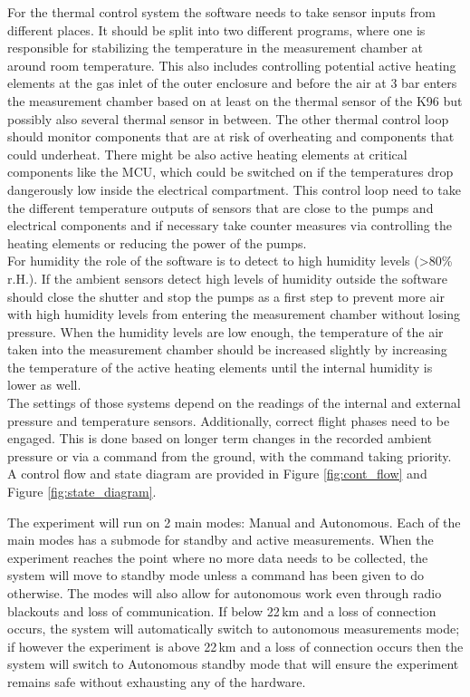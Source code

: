 \documentclass[
  a4paper,
  11pt,
  openany,
  parskip,
  toc=totoc,
  listof=totoc,
  bibliography=totoc
]{scrreprt}
\begin{document}
For the thermal control system the software needs to take sensor inputs from different places. It should be split into two different programs, where one is responsible for stabilizing the temperature in the measurement chamber at around room temperature. This also includes controlling potential active heating elements at the gas inlet of the outer enclosure and before the air at 3 bar enters the measurement chamber based on at least on the thermal sensor of the K96 but possibly also several thermal sensor in between. The other thermal control loop should monitor components that are at risk of overheating and components that could underheat. There might be also active heating elements at critical components like the MCU, which could be switched on if the temperatures drop dangerously low inside the electrical compartment. This control loop need to take the different temperature outputs of sensors that are close to the pumps and electrical components and if necessary take counter measures via controlling the heating elements or reducing the power of the pumps.\\
For humidity the role of the software is to detect to high humidity levels (>80\% r.H.). If the ambient sensors detect high levels of humidity outside the software should close the shutter and stop the pumps as a first step to prevent more air with high humidity levels from entering the measurement chamber without losing pressure. When the humidity levels are low enough, the temperature of the air taken into the measurement chamber should be increased slightly by increasing the temperature of the active heating elements until the internal humidity is lower as well.\\


The settings of those systems depend on the readings of the internal and external pressure and temperature sensors. Additionally, correct flight phases need to be engaged. This is done based on longer term changes in the recorded ambient pressure or via a command from the ground, with the command taking priority. A control flow and state diagram are provided in Figure \ref{fig:cont_flow} and Figure \ref{fig:state_diagram}.

The experiment will run on 2 main modes: Manual and Autonomous. Each of the main modes has a submode for standby and active measurements. When the experiment reaches the point where no more data needs to be collected, the system will move to standby mode unless a command has been given to do otherwise. The modes will also allow for autonomous work even through radio blackouts and loss of communication. If below 22\,km and a loss of connection occurs, the system will automatically switch to autonomous measurements mode; if however the experiment is above 22\,km and a loss of connection occurs then the system will switch to Autonomous standby mode that will ensure the experiment remains safe without exhausting any of the hardware.
\end{document}
